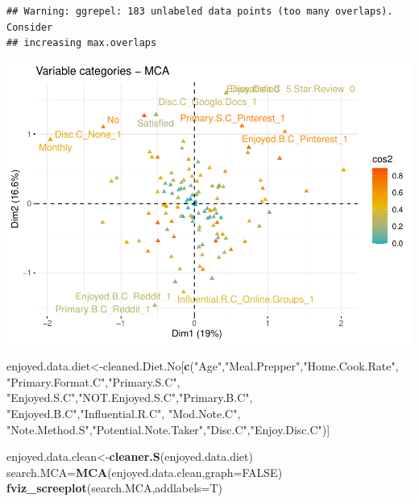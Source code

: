 \documentclass[
]{article}
\newenvironment{Shaded}{\begin{snugshade}}{\end{snugshade}}
\newcommand{\DataTypeTok}[1]{\textcolor[rgb]{0.13,0.29,0.53}{#1}}
\newcommand{\KeywordTok}[1]{\textcolor[rgb]{0.13,0.29,0.53}{\textbf{#1}}}
\newcommand{\NormalTok}[1]{#1}
\newcommand{\OtherTok}[1]{\textcolor[rgb]{0.56,0.35,0.01}{#1}}
\newcommand{\StringTok}[1]{\textcolor[rgb]{0.31,0.60,0.02}{#1}}
\begin{document}
\begin{Shaded}
\end{Shaded}

\begin{verbatim}
## Warning: ggrepel: 183 unlabeled data points (too many overlaps). Consider
## increasing max.overlaps
\end{verbatim}

\includegraphics{Average-User-MCA_files/figure-latex/diet yes enjoy-3.pdf}

\begin{Shaded}
\begin{Highlighting}[]
\NormalTok{enjoyed.data.diet<-cleaned.Diet.No[}\KeywordTok{c}\NormalTok{(}\StringTok{"Age"}\NormalTok{,}\StringTok{"Meal.Prepper"}\NormalTok{,}\StringTok{"Home.Cook.Rate"}\NormalTok{,}
                                     \StringTok{"Primary.Format.C"}\NormalTok{,}\StringTok{"Primary.S.C"}\NormalTok{,}
                               \StringTok{"Enjoyed.S.C"}\NormalTok{,}\StringTok{"NOT.Enjoyed.S.C"}\NormalTok{,}\StringTok{"Primary.B.C"}\NormalTok{,}
                               \StringTok{"Enjoyed.B.C"}\NormalTok{,}\StringTok{"Influential.R.C"}\NormalTok{, }\StringTok{"Mod.Note.C"}\NormalTok{,}
                               \StringTok{"Note.Method.S"}\NormalTok{,}\StringTok{"Potential.Note.Taker"}\NormalTok{,}\StringTok{"Disc.C"}\NormalTok{,}\StringTok{"Enjoy.Disc.C"}\NormalTok{)]}

\NormalTok{enjoyed.data.clean<-}\KeywordTok{cleaner.S}\NormalTok{(enjoyed.data.diet)}
\NormalTok{search.MCA=}\KeywordTok{MCA}\NormalTok{(enjoyed.data.clean,}\DataTypeTok{graph=}\OtherTok{FALSE}\NormalTok{)}
\KeywordTok{fviz_screeplot}\NormalTok{(search.MCA,}\DataTypeTok{addlabels=}\NormalTok{T)}
\end{Highlighting}
\end{Shaded}
\end{document}
